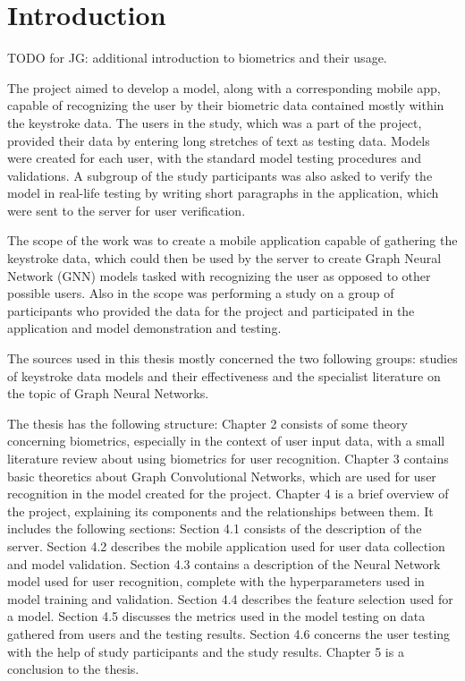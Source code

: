 
\chapter{Introduction}

TODO for JG: additional introduction to biometrics and their usage.

The project aimed to develop a model, along with a corresponding mobile app, capable of recognizing the user by their biometric data contained mostly within the keystroke data. The users in the study, which was a part of the project, provided their data by entering long stretches of text as testing data. Models were created for each user, with the standard model testing procedures and validations. A subgroup of the study participants was also asked to verify the model in real-life testing by writing short paragraphs in the application, which were sent to the server for user verification.

The scope of the work was to create a mobile application capable of gathering the keystroke data, which could then be used by the server to create Graph Neural Network (GNN) models tasked with recognizing the user as opposed to other possible users. Also in the scope was performing a study on a group of participants who provided the data for the project and participated in the application and model demonstration and testing.

The sources used in this thesis mostly concerned the two following groups: studies of keystroke data models and their effectiveness and the specialist literature on the topic of Graph Neural Networks.

The thesis has the following structure:
Chapter 2 consists of some theory concerning biometrics, especially in the context of user input data, with a small literature review about using biometrics for user recognition.
Chapter 3 contains basic theoretics about Graph Convolutional Networks, which are used for user recognition in the model created for the project.
Chapter 4 is a brief overview of the project, explaining its components and the relationships between them. It includes the following sections:
Section 4.1 consists of the description of the server.
Section 4.2 describes the mobile application used for user data collection and model validation.
Section 4.3 contains a description of the Neural Network model used for user recognition, complete with the hyperparameters used in model training and validation.
Section 4.4 describes the feature selection used for a model.
Section 4.5 discusses the metrics used in the model testing on data gathered from users and the testing results.
Section 4.6 concerns the user testing with the help of study participants and the study results.
Chapter 5 is a conclusion to the thesis.

